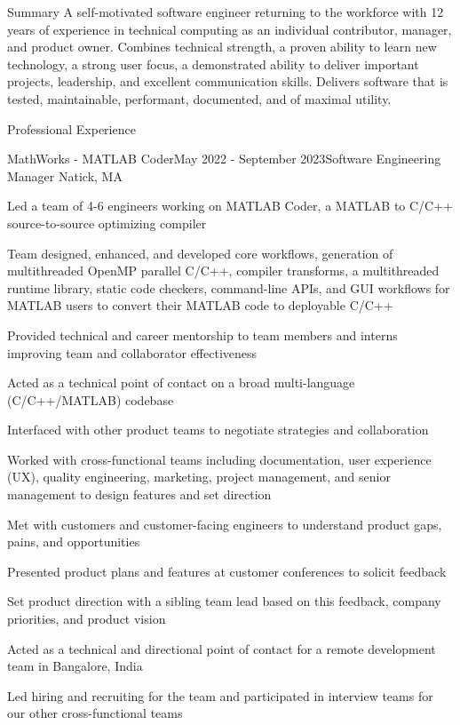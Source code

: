 \documentclass[
	usletter %
	10pt, %
]{resume} %
\begin{document}
\begin{rSection}{Summary}
	A self-motivated software engineer returning to the workforce with 12 years of experience in technical computing as an individual contributor, manager, and product owner. Combines technical strength, a proven ability to learn new technology, a strong user focus, a demonstrated ability to deliver important projects, leadership, and excellent communication skills. Delivers software that is tested, maintainable, performant, documented, and of maximal utility.
\end{rSection}

\begin{rSection}{Professional Experience}
	\begin{rSubsection}{MathWorks - MATLAB Coder}{May 2022 - September 2023}{Software Engineering Manager}
		{Natick, MA}
		\item Led a team of 4-6 engineers working on MATLAB Coder, a MATLAB to C/C++ source-to-source optimizing compiler
		\item Team designed, enhanced, and developed core workflows, generation of multithreaded OpenMP parallel C/C++, compiler transforms, a multithreaded runtime library, static code checkers, command-line APIs, and GUI workflows for MATLAB users to convert their MATLAB code to deployable C/C++ %
		\item Provided technical and career mentorship to team members and interns improving team and collaborator effectiveness
		\item Acted as a technical point of contact on a broad multi-language (C/C++/MATLAB) codebase
		\item Interfaced with other product teams to negotiate strategies and collaboration
		\item Worked with cross-functional teams including documentation, user experience (UX), quality engineering, marketing, project management, and senior management to design features and set direction
		\item Met with customers and customer-facing engineers to understand product gaps, pains, and opportunities
		\item Presented product plans and features at customer conferences to solicit feedback
		\item Set product direction with a sibling team lead based on this feedback, company priorities, and product vision
		\item Acted as a technical and directional point of contact for a remote development team in Bangalore, India
		\item Led hiring and recruiting for the team and participated in interview teams for our other cross-functional teams
	\end{rSubsection}


\end{rSection}
\end{document}
